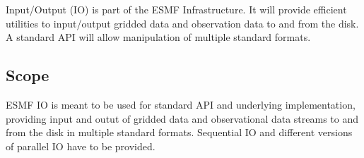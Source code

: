 Input/Output (IO) is part of the ESMF Infrastructure.  It will provide
efficient utilities to input/output gridded data and observation data
to and from the disk. A standard API will allow manipulation of multiple
standard formats.


\subsection{Scope}

ESMF IO is meant to be used for standard API and underlying
implementation, providing input and outut of gridded data and
observational data streams to and from the disk in multiple standard
formats. Sequential IO and different versions of parallel IO have to
be provided.  



















